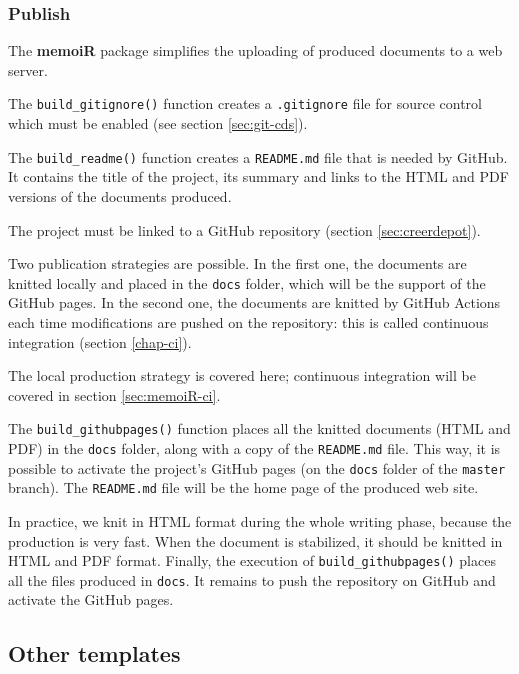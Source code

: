 \documentclass[
  12pt,
  american,
  a4paper,
  extrafontsizes,onecolumn,openright
  ]{memoir}
\begin{document}
\hypertarget{sec:article-en-ligne}{%
\subsubsection{Publish}\label{sec:article-en-ligne}}

The \textbf{memoiR} package simplifies the uploading of produced documents to a web server.

The \texttt{build\_gitignore()} function creates a \texttt{.gitignore} file for source control which must be enabled (see section \ref{sec:git-cds}).

The \texttt{build\_readme()} function creates a \texttt{README.md} file that is needed by GitHub.
It contains the title of the project, its summary and links to the HTML and PDF versions of the documents produced.

The project must be linked to a GitHub repository (section \ref{sec:creerdepot}).

Two publication strategies are possible.
In the first one, the documents are knitted locally and placed in the \texttt{docs} folder, which will be the support of the GitHub pages.
In the second one, the documents are knitted by GitHub Actions each time modifications are pushed on the repository: this is called continuous integration (section \ref{chap-ci}).

The local production strategy is covered here; continuous integration will be covered in section \ref{sec:memoiR-ci}.

The \texttt{build\_githubpages()} function places all the knitted documents (HTML and PDF) in the \texttt{docs} folder, along with a copy of the \texttt{README.md} file.
This way, it is possible to activate the project's GitHub pages (on the \texttt{docs} folder of the \texttt{master} branch).
The \texttt{README.md} file will be the home page of the produced web site.

In practice, we knit in HTML format during the whole writing phase, because the production is very fast.
When the document is stabilized, it should be knitted in HTML and PDF format.
Finally, the execution of \texttt{build\_githubpages()} places all the files produced in \texttt{docs}.
It remains to push the repository on GitHub and activate the GitHub pages.

\hypertarget{other-templates}{%
\subsection{Other templates}\label{other-templates}}
\end{document}
